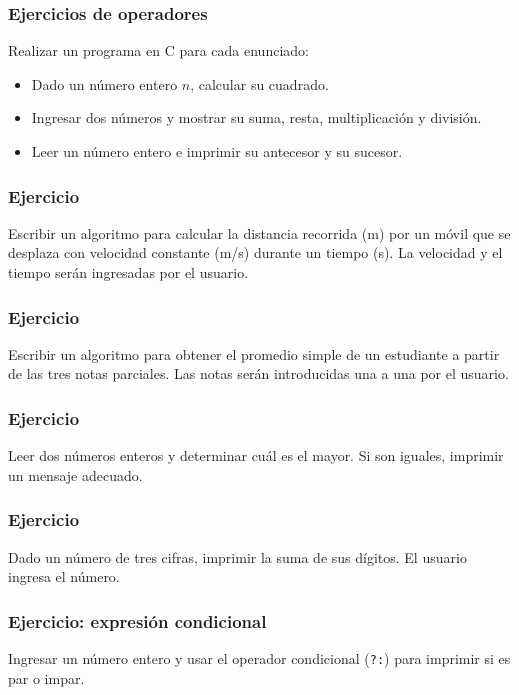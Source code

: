 \begin{ejercicioClase}
    \subsubsection{Ejercicios de operadores}
    Realizar un programa en C para cada enunciado:
    \begin{itemize}
          \item Dado un número entero \( n \), calcular su cuadrado.
          \item Ingresar dos números y mostrar su suma, resta, multiplicación y división.
          \item Leer un número entero e imprimir su antecesor y su sucesor.
    \end{itemize}

    \subsubsection{Ejercicio}
    Escribir un algoritmo para calcular la distancia recorrida (m) por un móvil que se desplaza con velocidad constante (m/s) durante un tiempo (s).
    La velocidad y el tiempo serán ingresadas por el usuario.

    \subsubsection{Ejercicio}
    Escribir un algoritmo para obtener el promedio simple de un estudiante a partir de las tres notas parciales.
    Las notas serán introducidas una a una por el usuario.

    \subsubsection{Ejercicio}
    Leer dos números enteros y determinar cuál es el mayor. Si son iguales, imprimir un mensaje adecuado.

    \subsubsection{Ejercicio}
    Dado un número de tres cifras, imprimir la suma de sus dígitos. El usuario ingresa el número.

    \subsubsection{Ejercicio: expresión condicional}
    Ingresar un número entero y usar el operador condicional (\texttt{?:}) para imprimir si es par o impar.
    

\end{ejercicioClase}


